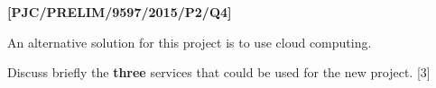 \item \textbf{{[}PJC/PRELIM/9597/2015/P2/Q4{]} }

An alternative solution for this project is to use cloud computing. 

Discuss briefly the \textbf{three} services that could be used for
the new project. \hfill{}{[}3{]}